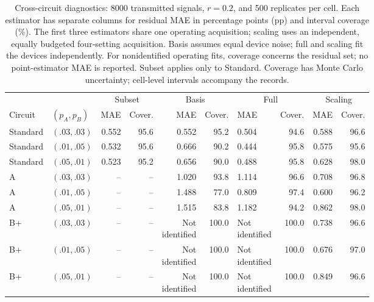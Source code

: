 \documentclass[manuscript,screen,review,anonymous]{acmart}
\begin{document}
\begin{table}[!htbp]
\centering
\small\setlength{\tabcolsep}{3pt}
\caption{Cross-circuit diagnostics: 8000 transmitted signals, $r=0.2$, and 500 replicates per cell. Each estimator has separate columns for residual MAE in percentage points (pp) and interval coverage (\%). The first three estimators share one operating acquisition; scaling uses an independent, equally budgeted four-setting acquisition. Basis assumes equal device noise; full and scaling fit the devices independently. For nonidentified operating fits, coverage concerns the residual set; no point-estimator MAE is reported. Subset applies only to Standard. Coverage has Monte Carlo uncertainty; cell-level intervals accompany the records.}
\label{tab:crosscircuit}
\begin{tabular}{@{}llrrrrlrrr@{}}
\toprule
& & \multicolumn{2}{c}{Subset} & \multicolumn{2}{c}{Basis} & \multicolumn{2}{c}{Full} & \multicolumn{2}{c}{Scaling} \\
Circuit & $(p_A,p_B)$ & MAE & Cover. & MAE & Cover. & MAE & Cover. & MAE & Cover. \\
\midrule
Standard & $(.03,.03)$ & 0.552 & 95.6 & 0.552 & 95.2 & 0.504 & 94.6 & 0.588 & 96.6 \\
Standard & $(.01,.05)$ & 0.532 & 95.6 & 0.666 & 90.2 & 0.444 & 95.8 & 0.575 & 95.6 \\
Standard & $(.05,.01)$ & 0.523 & 95.2 & 0.656 & 90.0 & 0.488 & 95.8 & 0.628 & 98.0 \\
A & $(.03,.03)$ & -- & -- & 1.020 & 93.8 & 1.114 & 96.6 & 0.708 & 96.8 \\
A & $(.01,.05)$ & -- & -- & 1.488 & 77.0 & 0.809 & 97.4 & 0.600 & 96.2 \\
A & $(.05,.01)$ & -- & -- & 1.515 & 83.8 & 1.182 & 94.2 & 0.862 & 98.0 \\
B+ & $(.03,.03)$ & -- & -- & \shortstack{Not\\identified} & 100.0 & \shortstack{Not\\identified} & 100.0 & 0.738 & 96.6 \\
B+ & $(.01,.05)$ & -- & -- & \shortstack{Not\\identified} & 100.0 & \shortstack{Not\\identified} & 100.0 & 0.676 & 97.0 \\
B+ & $(.05,.01)$ & -- & -- & \shortstack{Not\\identified} & 100.0 & \shortstack{Not\\identified} & 100.0 & 0.849 & 96.6 \\
\bottomrule
\end{tabular}
\end{table}
\end{document}
